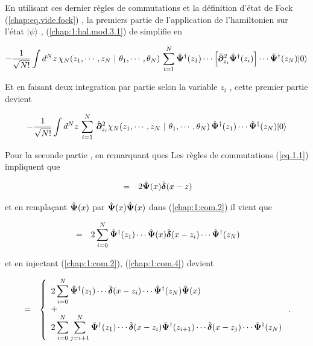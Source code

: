 En utilisant ces dernier règles de commutations et la définition d'état de Fock (\ref{chap:eq.vide.fock}) , la premiers partie de l'application de l'hamiltonien sur l'état $\vert \psi  \rangle$ , (\ref{chap:1:hal.mod.3.1}) de simplifie en 

\begin{eqnarray}
	 - \frac{1}{ \sqrt{N!}} \int d^N z \, \chi_N ( z_1 , \cdots , z_N  ~\vert ~ \theta_1 , \cdots , \theta _N ) \,	\sum_{i=1}^N  \hat{\bm{\Psi}}^\dag(z_1) \cdots \left [\hat{\bm{\partial}}_{z_i}^2 \hat{\bm{\Psi}}^\dag(z_i)\right ] \cdots\hat{\bm{\Psi}}^\dag(z_N) \vert 0 \rangle 	
\end{eqnarray}

Et en faisant deux integration par partie selon la variable $z_i$ , cette premier partie devient

\begin{eqnarray}
	 - \frac{1}{ \sqrt{N!}} \int d^N z \, \sum_{i=1}^N \, \hat{\bm{\partial}}_{z_i}^2\chi_N ( z_1 , \cdots , z_N  ~\vert ~ \theta_1 , \cdots , \theta _N ) \,	 \hat{\bm{\Psi}}^\dag(z_1)  \cdots\hat{\bm{\Psi}}^\dag(z_N) \vert 0 \rangle \label{chap:1:hal.mod.3.1.1}	
\end{eqnarray}

Pour la seconde partie  , en remarquant ques Les règles de commutations (\ref{eq.1.1}) impliquent que 

\begin{eqnarray}
	[ \operator{\Psi}(x) \operator{\Psi}(x),  \operator{\Psi}^\dag(z) ] & =& 2\operator{\Psi}(x)\operator{\delta}(x - z)\label{chap:1:com.3}  		
\end{eqnarray}

et en remplaçant $\hat{\bm{\Psi}}(x)$ par $\hat{\bm{\Psi}}(x)\hat{\bm{\Psi}}(x)$ dans  (\ref{chap:1:com.2}) il vient que  

\begin{eqnarray}
	[ \operator{\Psi}(x)\operator{\Psi}(x),  \operator{\Psi}^\dag(z_1)\cdots \operator{\Psi}^\dag(z_N)  ]  &=&  2\sum_{i = 0}^{N} \operator{\Psi}^\dag(z_1) \cdots  \operator{\Psi}(x)\operator{\delta}(x-z_i) \cdots \operator{\Psi}^\dag(z_N) \label{chap:1:com.4}		
\end{eqnarray}

et en injectant (\ref{chap:1:com.2}),  (\ref{chap:1:com.4}) devient 

\begin{eqnarray}
	[ \operator{\Psi}(x)\operator{\Psi}(x),  \operator{\Psi}^\dag(z_1)\cdots \operator{\Psi}^\dag(z_N)  ]  &=& \left\{ \begin{array}{l} \displaystyle 2\sum_{i = 0}^{N} \operator{\Psi}^\dag(z_1) \cdots  \operator{\delta}(x-z_i) \cdots \operator{\Psi}^\dag(z_N) \operator{\Psi}(x) \\ + \\ \displaystyle 2\sum_{i = 0}^{N}\sum_{j = i+1}^{N} \operator{\Psi}^\dag(z_1) \cdots\operator{\delta}(x-z_i)\operator{\Psi}^\dag(z_{i+1})\cdots  \operator{\delta}(x-z_j) \cdots \operator{\Psi}^\dag(z_N) \end{array}\right. \label{chap:1:com.5}	.	
\end{eqnarray}


